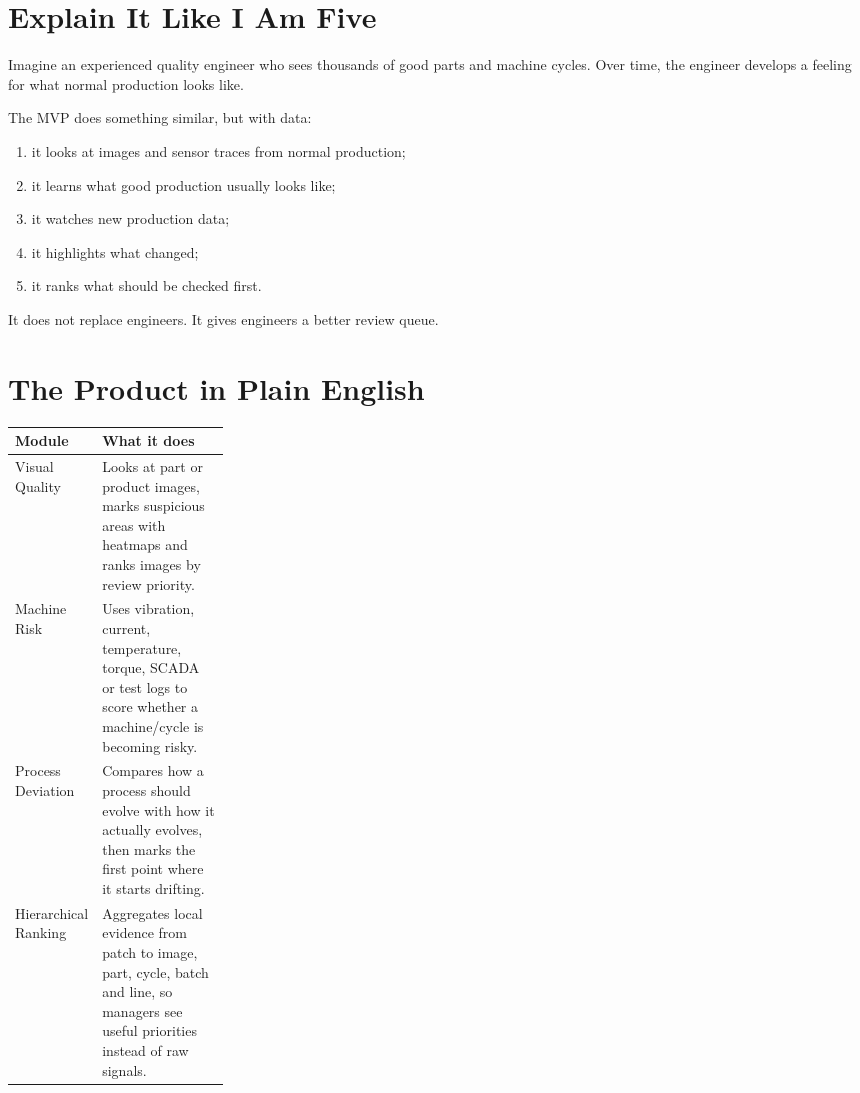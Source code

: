 \documentclass[11pt,a4paper]{article}
\begin{document}
\section{Explain It Like I Am Five}
Imagine an experienced quality engineer who sees thousands of good parts and machine cycles. Over time, the engineer develops a feeling for what normal production looks like.

The MVP does something similar, but with data:
\begin{enumerate}
  \item it looks at images and sensor traces from normal production;
  \item it learns what good production usually looks like;
  \item it watches new production data;
  \item it highlights what changed;
  \item it ranks what should be checked first.
\end{enumerate}

It does not replace engineers. It gives engineers a better review queue.

\section{The Product in Plain English}
\begin{tabularx}{\linewidth}{@{}p{0.25\linewidth}Y@{}}
\toprule
\textbf{Module} & \textbf{What it does} \\
\midrule
Visual Quality & Looks at part or product images, marks suspicious areas with heatmaps and ranks images by review priority. \\
Machine Risk & Uses vibration, current, temperature, torque, SCADA or test logs to score whether a machine/cycle is becoming risky. \\
Process Deviation & Compares how a process should evolve with how it actually evolves, then marks the first point where it starts drifting. \\
Hierarchical Ranking & Aggregates local evidence from patch to image, part, cycle, batch and line, so managers see useful priorities instead of raw signals. \\
\bottomrule
\end{tabularx}
\end{document}
